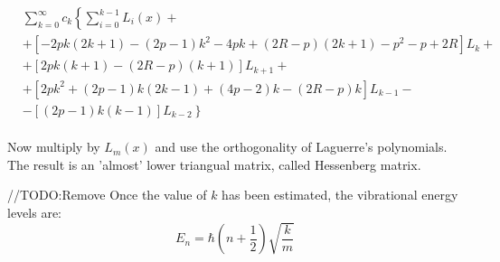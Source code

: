 \begin{equation}
\begin{split}
&  \sum_{k=0}^{\infty}c_k \left\{ \sum_{i = 0}^{k-1}{L_i(x)}  +  \right. \\[.8em] 
& + \left[ -2pk(2k+1) -(2p-1)k^2 -4pk +(2R-p)(2k+1) - p^2 -p + 2R \right]L_k + \\[.8em]
& + \left[2pk(k+1) - (2R-p)(k+1) \right]L_{k+1} + \\[.8em]
& + \left[2pk^2 + (2p-1)k(2k-1) + (4p-2)k - (2R-p)k \right]L_{k-1} - \\[.8em]
& \left. - \left[ (2p-1)k(k-1)  \right]L_{k-2}  \right\}
\end{split}
\end{equation}\\[1em]

Now multiply by $ L_m(x) $ and use the orthogonality of Laguerre's polynomials. The result is an 'almost' lower triangual matrix, called Hessenberg matrix.


//TODO:Remove
Once the value of $ k $ has been estimated, the vibrational energy levels are:
\begin{equation}
E_n = \hbar\left(n + \frac{1}{2}\right)\sqrt{\frac{k}{m}}
\end{equation}





